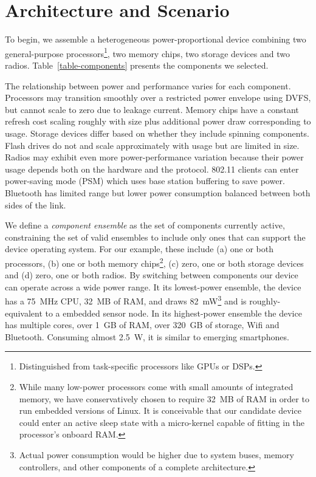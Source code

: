 \section{Architecture and Scenario}
\label{section-architecture}



To begin, we assemble a heterogeneous power-proportional device combining two
general-purpose processors\footnote{Distinguished from task-specific
processors like GPUs or DSPs.}, two memory chips, two storage devices and two
radios. Table~\ref{table-components} presents the components we selected.

The relationship between power and performance varies for each component.
Processors may transition smoothly over a restricted power envelope using
DVFS, but cannot scale to zero due to leakage current. Memory chips have a
constant refresh cost scaling roughly with size plus additional power draw
corresponding to usage. Storage devices differ based on whether they include
spinning components. Flash drives do not and scale approximately with usage
but are limited in size. Radios may exhibit even more power-performance
variation because their power usage depends both on the hardware and the
protocol. 802.11 clients can enter power-saving mode (PSM) which uses base
station buffering to save power. Bluetooth has limited range but lower power
consumption balanced between both sides of the link.

We define a \textit{component ensemble} as the set of components currently
active, constraining the set of valid ensembles to include only ones that can
support the device operating system. For our example, these include (a) one
or both processors, (b) one or both memory chips\footnote{While many
low-power processors come with small amounts of integrated memory, we have
conservatively chosen to require 32~MB of RAM in order to run embedded
versions of Linux. It is conceivable that our candidate device could enter an
active sleep state with a micro-kernel capable of fitting in the processor's
onboard RAM.}, (c) zero, one or both storage devices and (d) zero, one or
both radios. By switching between components our device can operate across a
wide power range. It its lowest-power ensemble, the device has a 75~MHz CPU,
32~MB of RAM, and draws 82~mW\footnote{Actual power consumption would be
higher due to system buses, memory controllers, and other components of a
complete architecture.} and is roughly-equivalent to a embedded sensor node.
In its highest-power ensemble the device has multiple cores, over 1~GB of
RAM, over 320~GB of storage, Wifi and Bluetooth. Consuming almost 2.5~W, it
is similar to emerging smartphones.


